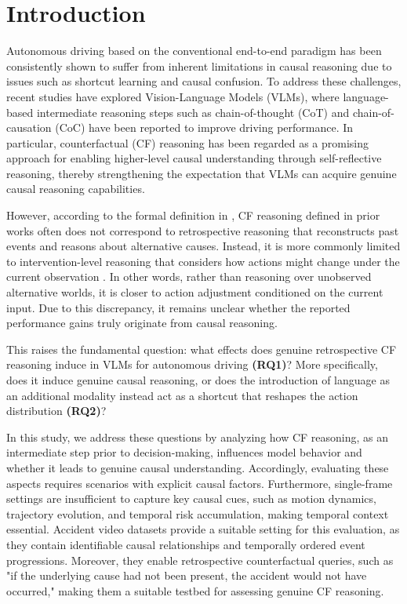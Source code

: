 \documentclass{article}
\begin{document}
\section{Introduction}

Autonomous driving based on the conventional end-to-end paradigm has been consistently shown to suffer from inherent limitations in causal reasoning due to issues such as shortcut learning and causal confusion. To address these challenges, recent studies have explored Vision-Language Models (VLMs), where language-based intermediate reasoning steps such as chain-of-thought (CoT) \cite{e2e-vlm:drivelm, e2e-vlm:drivegpt4} and chain-of-causation (CoC) \cite{causal:e2e-vlm:coc-vla, causal:e2e-vlm:alpamayo} have been reported to improve driving performance. In particular, counterfactual (CF) reasoning \cite{causal:e2e-vlm:omnidrive, causal:cf_vla, robotics:cast, robotics:chop} has been regarded as a promising approach for enabling higher-level causal understanding through self-reflective reasoning, thereby strengthening the expectation that VLMs can acquire genuine causal reasoning capabilities.

However, according to the formal definition in \cite{causal:ladder_of_causation}, CF reasoning defined in prior works \cite{causal:e2e-vlm:omnidrive, causal:cf_vla} often does not correspond to retrospective reasoning that reconstructs past events and reasons about alternative causes. Instead, it is more commonly limited to intervention-level reasoning that considers how actions might change under the current observation \cite{causal:e2e-vlm:simlingo}. In other words, rather than reasoning over unobserved alternative worlds, it is closer to action adjustment conditioned on the current input. Due to this discrepancy, it remains unclear whether the reported performance gains truly originate from causal reasoning.

This raises the fundamental question: what effects does genuine retrospective CF reasoning induce in VLMs for autonomous driving \textbf{(RQ1)}? More specifically, does it induce genuine causal reasoning, or does the introduction of language as an additional modality instead act as a shortcut that reshapes the action distribution \textbf{(RQ2)}?

In this study, we address these questions by analyzing how CF reasoning, as an intermediate step prior to decision-making, influences model behavior and whether it leads to genuine causal understanding. Accordingly, evaluating these aspects requires scenarios with explicit causal factors. Furthermore, single-frame settings are insufficient to capture key causal cues, such as motion dynamics, trajectory evolution, and temporal risk accumulation, making temporal context essential. Accident video datasets provide a suitable setting for this evaluation, as they contain identifiable causal relationships and temporally ordered event progressions. Moreover, they enable retrospective counterfactual queries, such as "if the underlying cause had not been present, the accident would not have occurred," making them a suitable testbed for assessing genuine CF reasoning. 
\end{document}
